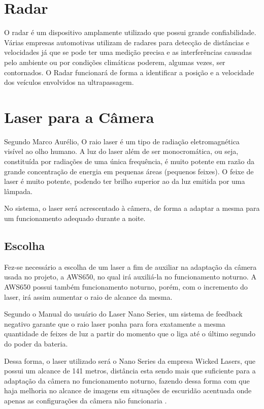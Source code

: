 \section{Radar}

O radar é um dispositivo amplamente utilizado que possui grande confiabilidade. Várias empresas automotivas utilizam de radares para detecção de distâncias e velocidades já que se pode ter uma medição precisa e as interferências causadas pelo ambiente ou por condições climáticas poderem, algumas vezes, ser contornados. O Radar funcionará de forma a identificar a posição e a velocidade dos veículos envolvidos na ultrapassagem.

\section{Laser para a Câmera}

Segundo Marco Aurélio, O raio laser é um tipo de radiação eletromagnética visível ao olho humano. A luz do laser além de ser monocromática, ou seja, constituída por radiações de uma única frequência, é muito potente em razão da grande concentração de energia em pequenas áreas (pequenos feixes). O feixe de laser é muito potente, podendo ter brilho superior ao da luz emitida por uma lâmpada.

No sistema, o laser será acrescentado à câmera, de forma a adaptar a mesma para um funcionamento adequado durante a noite.

\subsection{Escolha}

Fez-se necessário a escolha de um laser a fim de auxiliar na adaptação da câmera usada no projeto, a AWS650, no qual irá auxiliá-la no funcionamento noturno. A AWS650 possui também funcionamento noturno, porém, com o incremento do laser, irá assim aumentar o raio de alcance da mesma. 

Segundo o Manual do usuário do Laser Nano Series, um sistema de feedback negativo garante que o raio laser ponha para fora exatamente a mesma quantidade de feixes de luz a partir do momento que o liga até o último segundo do poder da bateria.

Dessa forma, o laser utilizado será o Nano Series da empresa Wicked Lasers, que possui um alcance de 141 metros, distância esta sendo mais que suficiente para a adaptação da câmera no funcionamento noturno, fazendo dessa forma com que haja melhoria no alcance de imagens em situações de escuridão acentuada onde apenas as configurações da câmera não funcionaria .

